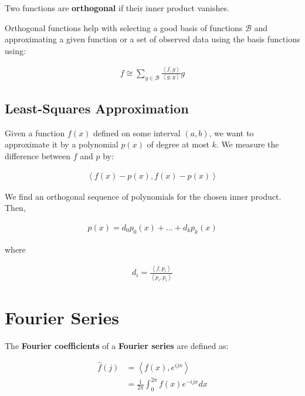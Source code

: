 \documentclass[11pt]{article}
\begin{document}
Two functions are \textbf{orthogonal} if their inner product vanishes.

Orthogonal functions help with selecting a good basis of functions \(\mathcal{B}\) and approximating a given function or a set of observed data using the basis functions using:

\begin{align*}
f \cong \sum_{g\in\mathcal{B}} \frac{\left\langle f,g \right\rangle}{\left\langle g,g \right\rangle}g
\end{align*}

\subsection{Least-Squares Approximation}
\label{sec:org43a78c2}
Given a function \(f\left(x\right)\) defined on some interval \(\left(a,b\right)\), we want to approximate it by a polynomial \(p\left(x\right)\) of degree at most \(k\). We measure the difference between \(f\) and \(p\) by:

\begin{align*}
    \left\langle f\left(x\right) - p\left(x\right), f\left(x\right) - p\left(x\right)\right\rangle
\end{align*}

We find an orthogonal sequence of polynomials for the chosen inner product. Then,

\begin{align*}
    p\left(x\right) = d_{0}p_{0}\left(x\right) + \ldots + d_{k}p_{k}\left(x\right)
\end{align*}

where

\begin{align*}
    d_{i} = \frac{\left\langle f, p_{i} \right\rangle}{\left\langle p_{i}, p_{i} \right\rangle}
\end{align*}

\section{Fourier Series}
\label{sec:orgcc29e0e}
The \textbf{Fourier coefficients} of a \textbf{Fourier series} are defined as:

\begin{align*}
    \hat{f}\left(j\right) &= \left\langle f\left(x\right),e^{ijx} \right\rangle \\
    &= \frac{1}{2\pi}\int_{0}^{2\pi} f\left(x\right)e^{-ijx}dx
\end{align*}
\end{document}
